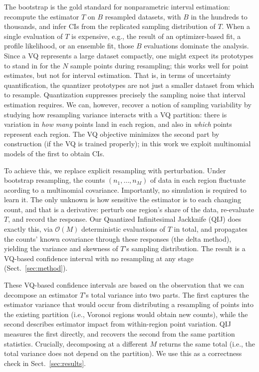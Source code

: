 \documentclass[runningheads]{llncs}
\begin{document}
The bootstrap \cite{efron1979} is the gold standard for nonparametric interval estimation: recompute the estimator $T$ on $B$ resampled datasets, with $B$ in the hundreds to thousands, and infer CIs from the replicated sampling distribution of $T$. When a single evaluation of $T$ is expensive, e.g., the result of an optimizer-based fit, a profile likelihood, or an ensemble fit, those $B$ evaluations dominate the analysis. Since a VQ represents a large dataset compactly, one might expect its prototypes to stand in for the $N$ sample points during resampling; this works well for point estimates, but not for interval estimation. That is, in terms of uncertainty quantification, the quantizer prototypes are not just a smaller dataset from which to resample. Quantization suppresses precisely the sampling noise that interval estimation requires. We can, however, recover a notion of sampling variability by studying how resampling variance interacts with a VQ partition: there is variation in \emph{how many} points land in each region, and also in \emph{which} points represent each region. The VQ objective minimizes the second part by construction (if the VQ is trained properly); in this work we exploit multinomial models of the first to obtain CIs.

To achieve this, we replace explicit resampling with perturbation. Under bootstrap resampling, the counts $(n_1,\dots,n_M)$ of data in each region fluctuate acording to a multinomial covariance. Importantly, no simulation is required to learn it. The only unknown is how sensitive the estimator is to each changing count, and that is a derivative: perturb one region's share of the data, re-evaluate $T$, and record the response. Our Quantized Infinitesimal Jackknife (QIJ) does exactly this, via $\mathcal{O}(M)$ deterministic evaluations of $T$ in total, and propagates the counts' known covariance through these responses (the delta method), yielding the variance and skewness of $T$'s sampling distribution. The result is a VQ-based confidence interval with no resampling at any stage (Sect.~\ref{sec:method}).

These VQ-based confidence intervals are based on the observation that we can decompose an estimator $T$'s total variance into two parts. The first captures the estimator variance that would occur from distributing a resampling of points into the existing partition (i.e., Voronoi regions would obtain new counts), while the second describes estimator impact from within-region point variation. QIJ measures the first directly, and recovers the second from the same partition statistics. Crucially, decomposing at a different $M$ returns the same total (i.e., the total variance does not depend on the partition). We use this as a correctness check in Sect.~\ref{sec:results}.
\end{document}
